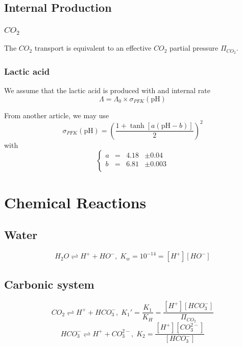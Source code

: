 \documentclass{revtex4}
\begin{document}
\subsection{Internal Production}

\subsubsection{$CO_2$}
The $CO_2$ transport is equivalent to an effective $CO_2$ partial pressure $\Pi_{CO_2}$.

\subsubsection{Lactic acid}
We assume that the lactic acid is produced with and internal rate
\begin{equation}
	\Lambda = \Lambda_0 \times \sigma_{PFK}\left(\mathrm{pH}\right)
\end{equation}

From another article, we may use
\begin{equation}
\sigma_{PFK}\left(\mathrm{pH}\right)  = \left(\dfrac{1+\tanh\left[ a \left(\mathrm{pH}-b\right)\right] }{2}\right)^2
\end{equation}
with
\begin{equation}
	\left\lbrace
	\begin{array}{rcll}
	a & = & 4.18 & \pm 0.04\\
	b & = & 6.81 & \pm 0.003\\
	\end{array}
	\right.
\end{equation}


\section{Chemical Reactions}

\subsection{Water}
\begin{equation}
	H_2O \rightleftharpoons H^+ + HO^-, \; K_w = 10^{-14} = \left[H^+\right]\left[HO^-\right]
\end{equation}	

\subsection{Carbonic system}
\begin{equation}
	CO_2 \rightleftharpoons H^+ + HCO_3^-, \; K_1' = \dfrac{K_1}{K_H} = \dfrac{\left[H^+\right]\left[HCO_3^-\right]}{\Pi_{CO_2}}
\end{equation}
\begin{equation}
	HCO_3^- \rightleftharpoons H^+ + CO_3^{2-}, \; K_2  = \dfrac{\left[H^+\right]\left[CO_3^{2-}\right]}{\left[HCO_3^-\right]}
\end{equation}
\end{document}
